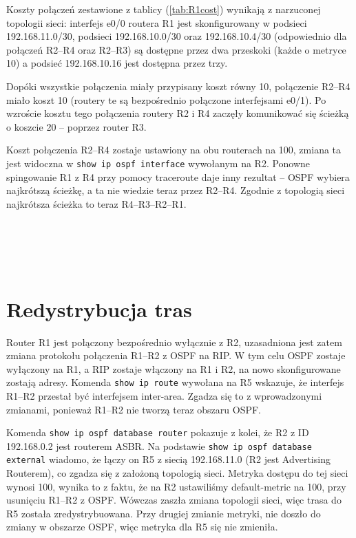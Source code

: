 \documentclass[a4paper,12pt,notitlepage]{article}
\begin{document}
Koszty połączeń zestawione z tablicy (\ref{tab:R1cost}) wynikają z narzuconej topologii sieci: interfejs e0/0 routera R1 jest skonfigurowany w podsieci 192.168.11.0/30, podsieci 192.168.10.0/30 oraz 192.168.10.4/30 (odpowiednio dla połączeń R2--R4 oraz R2--R3) są dostępne przez dwa przeskoki (każde o metryce 10) a podsieć 192.168.10.16 jest dostępna przez trzy.

Dopóki wszystkie połączenia miały przypisany koszt równy 10, połączenie R2--R4 miało koszt 10 (routery te są bezpośrednio połączone interfejsami e0/1). Po wzroście kosztu tego połączenia routery R2 i R4 zaczęły komunikować się ścieżką o koszcie 20 -- poprzez router R3.

Koszt połączenia R2--R4 zostaje ustawiony na obu routerach na 100, zmiana ta jest widoczna w \texttt{show ip ospf interface} wywołanym na R2. Ponowne spingowanie R1 z R4 przy pomocy traceroute daje inny rezultat -- OSPF wybiera najkrótszą ścieżkę, a ta nie wiedzie teraz przez R2--R4. Zgodnie z topologią sieci najkrótsza ścieżka to teraz R4--R3--R2--R1.

\inputminted[label=Router R4 - \#ping 192.168.11.1, firstline=377, lastline=379]{text}{R4.txt}
\inputminted[label=Router R4 - \#traceroute 192.168.11.1, firstline=394, lastline=397]{text}{R4.txt}

\inputminted[label=Router R2 - koszty łączy, firstline=247, lastline=251]{text}{R2.txt}

\inputminted[label=Router R2 - koszty łączy po zmianie, firstline=325, lastline=372]{text}{R2.txt}

\inputminted[label=Router R4 - \#ping 192.168.11.1, firstline=535, lastline=537]{text}{R4.txt}
\inputminted[label=Router R4 - \#traceroute 192.168.11.1, firstline=541, lastline=545]{text}{R4.txt}

\section{Redystrybucja tras}
Router R1 jest połączony bezpośrednio wyłącznie z R2, uzasadniona jest zatem zmiana protokołu połączenia R1--R2 z OSPF na RIP. W tym celu OSPF zostaje wyłączony na R1, a RIP zostaje włączony na R1 i R2, na nowo skonfigurowane zostają adresy. Komenda \texttt{show ip route} wywołana na R5 wskazuje, że interfejs R1--R2 przestał być interfejsem inter-area. Zgadza się to z wprowadzonymi zmianami, ponieważ R1--R2 nie tworzą teraz obszaru OSPF.

Komenda \texttt{show ip ospf database router} pokazuje z kolei, że R2 z ID 192.168.0.2 jest routerem ASBR. Na podstawie \texttt{show ip ospf database external} wiadomo, że łączy on R5 z siecią 192.168.11.0 (R2 jest Advertising Routerem), co zgadza się z założoną topologią sieci. Metryka dostępu do tej sieci wynosi 100, wynika to z faktu, że na R2 ustawiliśmy default-metric na 100, przy usunięciu R1--R2 z OSPF. Wówczas zaszła zmiana topologii sieci, więc trasa do R5 została zredystrybuowana. Przy drugiej zmianie metryki, nie doszło do zmiany w obszarze OSPF, więc metryka dla R5 się nie zmieniła.
\inputminted[label=Router R1 - \#show ip route, firstline=838, lastline=844]{text}{R1.txt}
\inputminted[label=Router R5 - \#show ip route, firstline=718, lastline=728]{text}{R5.txt}

\inputminted[label=Router R5 - stan końcowy, firstline=729, lastline=817]{text}{R5.txt}
\end{document}
